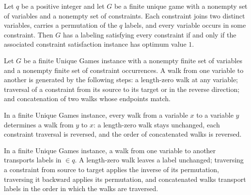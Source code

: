 \begin{theorem}
\label{FABL.FiniteUniqueGame.satisfiable_iff_csp_satisfiable}
\leanok
{}
Let $q$ be a positive integer and let $G$ be a finite unique game with a nonempty set of
variables and a nonempty set of constraints. Each constraint joins two distinct
variables, carries a permutation of the $q$ labels, and every variable occurs in some
constraint. Then $G$ has a labeling satisfying every constraint if and only if the
associated constraint satisfaction instance has optimum value $1$.
\end{theorem}

\begin{definition}
\label{FABL.FiniteUniqueGame.Walk}
\leanok
{}
Let $G$ be a finite Unique Games instance with a nonempty finite set of variables and a
nonempty finite set of constraint occurrences. A walk from one variable to another is
generated by the following steps: a length-zero walk at any variable; traversal of a
constraint from its source to its target or in the reverse direction; and concatenation
of two walks whose endpoints match.
\end{definition}

\begin{definition}
\label{FABL.FiniteUniqueGame.Walk.reverse}
\leanok
{}
In a finite Unique Games instance, every walk from a variable $x$ to a variable $y$
determines a walk from $y$ to $x$: a length-zero walk stays unchanged, each constraint
traversal is reversed, and the order of concatenated walks is reversed.
\end{definition}

\begin{definition}
\label{FABL.FiniteUniqueGame.Walk.transport}
\leanok
{}
In a finite Unique Games instance, a walk from one variable to another transports labels
in $\in q$. A length-zero walk leaves a label unchanged; traversing a constraint from
source to target applies the inverse of its permutation, traversing it backward applies
its permutation, and concatenated walks transport labels in the order in which the walks
are traversed.
\end{definition}

